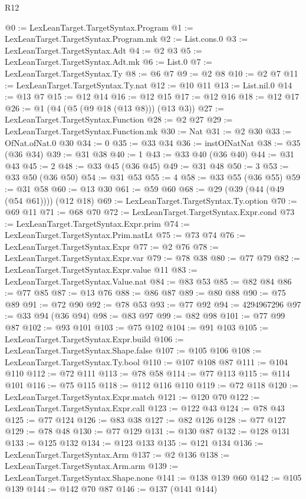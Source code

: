 \begin{lexlean}{R12}
\begin{coremodule}
@0 := LexLeanTarget.TargetSyntax.Program
@1 := LexLeanTarget.TargetSyntax.Program.mk
@2 := List.cons.{0}
@3 := LexLeanTarget.TargetSyntax.Adt
@4 := @2 @3
@5 := LexLeanTarget.TargetSyntax.Adt.mk
@6 := List.{0}
@7 := LexLeanTarget.TargetSyntax.Ty
@8 := @6 @7
@9 := @2 @8
@10 := @2 @7
@11 := LexLeanTarget.TargetSyntax.Ty.nat
@12 := @10 @11
@13 := List.nil.{0}
@14 := @13 @7
@15 := @12 @14
@16 := @12 @15
@17 := @12 @16
@18 := @12 @17
@26 := @1 (@4 (@5 (@9 @18 (@13 @8))) (@13 @3))
@27 := LexLeanTarget.TargetSyntax.Function
@28 := @2 @27
@29 := LexLeanTarget.TargetSyntax.Function.mk
@30 := Nat
@31 := @2 @30
@33 := OfNat.ofNat.{0} @30
@34 := 0
@35 := @33 @34
@36 := instOfNatNat
@38 := @35 (@36 @34)
@39 := @31 @38
@40 := 1
@43 := @33 @40 (@36 @40)
@44 := @31 @43
@45 := 2
@48 := @33 @45 (@36 @45)
@49 := @31 @48
@50 := 3
@53 := @33 @50 (@36 @50)
@54 := @31 @53
@55 := 4
@58 := @33 @55 (@36 @55)
@59 := @31 @58
@60 := @13 @30
@61 := @59 @60
@68 := @29 (@39 (@44 (@49 (@54 @61)))) (@12 @18)
@69 := LexLeanTarget.TargetSyntax.Ty.option
@70 := @69 @11
@71 := @68 @70
@72 := LexLeanTarget.TargetSyntax.Expr.cond
@73 := LexLeanTarget.TargetSyntax.Expr.prim
@74 := LexLeanTarget.TargetSyntax.Prim.natLt
@75 := @73 @74
@76 := LexLeanTarget.TargetSyntax.Expr
@77 := @2 @76
@78 := LexLeanTarget.TargetSyntax.Expr.var
@79 := @78 @38
@80 := @77 @79
@82 := LexLeanTarget.TargetSyntax.Expr.value @11
@83 := LexLeanTarget.TargetSyntax.Value.nat
@84 := @83 @53
@85 := @82 @84
@86 := @77 @85
@87 := @13 @76
@88 := @86 @87
@89 := @80 @88
@90 := @75 @89
@91 := @72 @90
@92 := @78 @53
@93 := @77 @92
@94 := 4294967296
@97 := @33 @94 (@36 @94)
@98 := @83 @97
@99 := @82 @98
@101 := @77 @99 @87
@102 := @93 @101
@103 := @75 @102
@104 := @91 @103
@105 := LexLeanTarget.TargetSyntax.Expr.build
@106 := LexLeanTarget.TargetSyntax.Shape.false
@107 := @105 @106
@108 := LexLeanTarget.TargetSyntax.Ty.bool
@110 := @107 @108 @87
@111 := @104 @110
@112 := @72 @111
@113 := @78 @58
@114 := @77 @113
@115 := @114 @101
@116 := @75 @115
@118 := @112 @116 @110
@119 := @72 @118
@120 := LexLeanTarget.TargetSyntax.Expr.match
@121 := @120 @70
@122 := LexLeanTarget.TargetSyntax.Expr.call
@123 := @122 @43
@124 := @78 @43
@125 := @77 @124
@126 := @83 @38
@127 := @82 @126
@128 := @77 @127
@129 := @78 @48
@130 := @77 @129
@131 := @130 @87
@132 := @128 @131
@133 := @125 @132
@134 := @123 @133
@135 := @121 @134
@136 := LexLeanTarget.TargetSyntax.Arm
@137 := @2 @136
@138 := LexLeanTarget.TargetSyntax.Arm.arm
@139 := LexLeanTarget.TargetSyntax.Shape.none
@141 := @138 @139 @60
@142 := @105 @139
@144 := @142 @70 @87
@146 := @137 (@141 @144)

\end{coremodule}
\end{lexlean}
